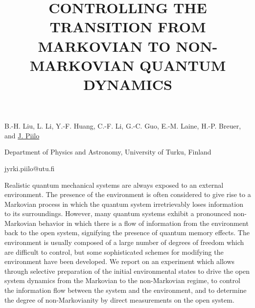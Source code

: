 \title{CONTROLLING THE TRANSITION FROM MARKOVIAN TO NON-MARKOVIAN QUANTUM DYNAMICS}

B.-H. Liu, L. Li, Y.-F. Huang, C.-F. Li,  G.-C. Guo, E.-M. Laine, H.-P. Breuer, and \underline{J. Piilo}

{\normalsize{\vspace{-4mm}
Department of Physics and Astronomy, University of Turku, Finland

\email jyrki.piilo@utu.fi}}

Realistic quantum mechanical systems are always exposed to an external environment. The presence of the environment is often
considered to give rise to a Markovian process in which the quantum system irretrievably loses information to its surroundings.
However, many quantum systems exhibit a pronounced non-Markovian behavior in which there is a flow of information from the
environment back to the open system, signifying the presence of quantum memory effects. The environment is usually composed
of a large number of degrees of freedom which are difficult to control, but some sophisticated schemes for modifying the
environment have been developed. We report on an experiment which allows through selective preparation of the initial
environmental states to drive the open system dynamics from the Markovian to the non-Markovian regime, to control the
information flow between the system and the environment, and to determine the degree of non-Markovianity by direct
measurements on the open system.

\vspace{\baselineskip} 